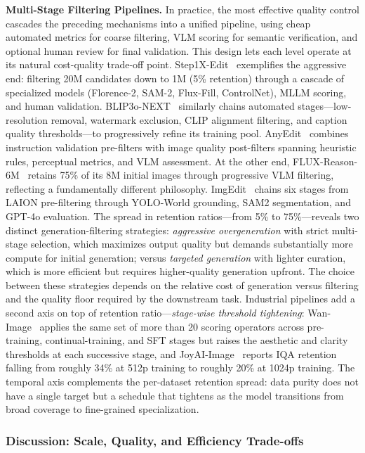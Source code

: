 \textbf{Multi-Stage Filtering Pipelines.}
In practice, the most effective quality control cascades the preceding mechanisms into a unified pipeline, using cheap automated metrics for coarse filtering, VLM scoring for semantic verification, and optional human review for final validation. This design lets each level operate at its natural cost-quality trade-off point. Step1X-Edit~\citep{liu2025step1x} exemplifies the aggressive end: filtering 20M candidates down to 1M (5\% retention) through a cascade of specialized models (Florence-2, SAM-2, Flux-Fill, ControlNet), MLLM scoring, and human validation. BLIP3o-NEXT~\citep{chen2025blip3o} similarly chains automated stages---low-resolution removal, watermark exclusion, CLIP alignment filtering, and caption quality thresholds---to progressively refine its training pool. AnyEdit~\citep{yu2025anyedit} combines instruction validation pre-filters with image quality post-filters spanning heuristic rules, perceptual metrics, and VLM assessment. At the other end, FLUX-Reason-6M~\citep{fang2025flux} retains 75\% of its 8M initial images through progressive VLM filtering, reflecting a fundamentally different philosophy. ImgEdit~\citep{ye2025imgedit} chains six stages from LAION pre-filtering through YOLO-World grounding, SAM2 segmentation, and GPT-4o evaluation. The spread in retention ratios---from 5\% to 75\%---reveals two distinct generation-filtering strategies: \emph{aggressive overgeneration} with strict multi-stage selection, which maximizes output quality but demands substantially more compute for initial generation; versus \emph{targeted generation} with lighter curation, which is more efficient but requires higher-quality generation upfront. The choice between these strategies depends on the relative cost of generation versus filtering and the quality floor required by the downstream task. Industrial pipelines add a second axis on top of retention ratio---\emph{stage-wise threshold tightening}: Wan-Image~\citep{mao2026wan} applies the same set of more than 20 scoring operators across pre-training, continual-training, and SFT stages but raises the aesthetic and clarity thresholds at each successive stage, and JoyAI-Image~\citep{jdjoyaiimage} reports IQA retention falling from roughly 34\% at 512p training to roughly 20\% at 1024p training. The temporal axis complements the per-dataset retention spread: data purity does not have a single target but a schedule that tightens as the model transitions from broad coverage to fine-grained specialization.

\subsubsection{Discussion: Scale, Quality, and Efficiency Trade-offs}
\label{sec:tradeoffs}

